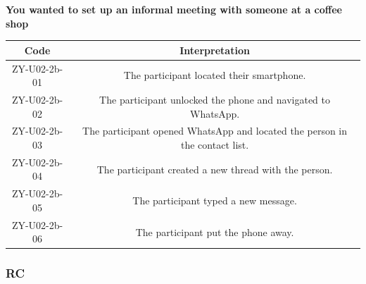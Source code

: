 \documentclass[acmsmall,screen,authorversion,nonacm]{acmart}
\begin{document}
\begin{center}
\textbf{You wanted to set up an informal meeting with someone at a coffee shop}
\begin{tabular}{|c|c|}
\hline
\textbf{Code} & \textbf{Interpretation}                                                     \\ \hline
ZY-U02-2b-01  & The participant located their smartphone.                                   \\ \hline
ZY-U02-2b-02  & The participant unlocked the phone and navigated to WhatsApp.               \\ \hline
ZY-U02-2b-03  & The participant opened WhatsApp and located the person in the contact list. \\ \hline
ZY-U02-2b-04  & The participant created a new thread with the person.                       \\ \hline
ZY-U02-2b-05  & The participant typed a new message.                                        \\ \hline
ZY-U02-2b-06  & The participant put the phone away.                                         \\ \hline
\end{tabular}
\end{center}


\subsubsection{RC}
\label{C-RC}
\end{document}
